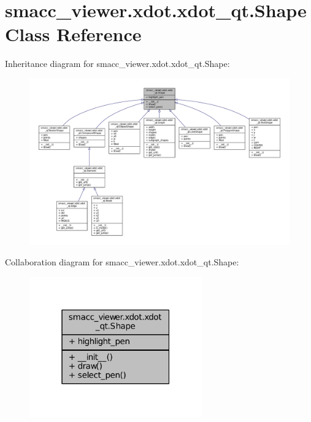 \hypertarget{classsmacc__viewer_1_1xdot_1_1xdot__qt_1_1Shape}{}\section{smacc\+\_\+viewer.\+xdot.\+xdot\+\_\+qt.\+Shape Class Reference}
\label{classsmacc__viewer_1_1xdot_1_1xdot__qt_1_1Shape}


Inheritance diagram for smacc\+\_\+viewer.\+xdot.\+xdot\+\_\+qt.\+Shape\+:
\nopagebreak
\begin{figure}[H]
\begin{center}
\leavevmode
\includegraphics[width=350pt]{classsmacc__viewer_1_1xdot_1_1xdot__qt_1_1Shape__inherit__graph}
\end{center}
\end{figure}


Collaboration diagram for smacc\+\_\+viewer.\+xdot.\+xdot\+\_\+qt.\+Shape\+:
\nopagebreak
\begin{figure}[H]
\begin{center}
\leavevmode
\includegraphics[width=211pt]{classsmacc__viewer_1_1xdot_1_1xdot__qt_1_1Shape__coll__graph}
\end{center}
\end{figure}
